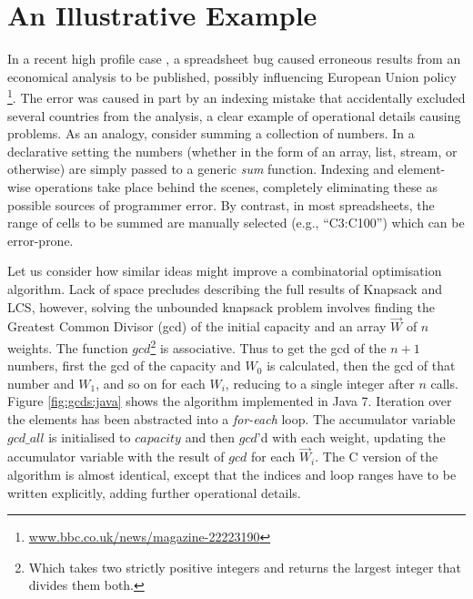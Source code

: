 \section{An Illustrative Example}
In a recent high profile case \cite{Herndon13}, a spreadsheet bug caused
erroneous results from an economical analysis to be published, possibly
influencing European Union policy%
\footnote{\url{www.bbc.co.uk/news/magazine-22223190}}.
The error was caused in part by an indexing mistake that accidentally excluded
several countries from the analysis, a clear example of operational details causing
problems.
As an analogy, consider summing a collection of numbers. In a declarative
setting
the numbers (whether in the form of an array, list, stream, or
otherwise) are simply passed to a generic \emph{sum} function. Indexing and
element-wise operations take place behind the scenes, completely eliminating
these as possible sources of programmer error. By contrast, in most spreadsheets, the range of cells to
be summed are manually selected (e.g., ``C3:C100'') which can be error-prone.


Let us consider how similar ideas might improve a combinatorial
optimisation algorithm. 
Lack of space precludes describing the full results of Knapsack and LCS, however, solving the unbounded knapsack problem involves finding the Greatest Common Divisor (gcd) of the initial capacity and an array $\vec{W}$ of $n$
weights. The function $gcd$\footnote{Which takes two strictly positive integers and returns the largest integer that divides them both.}
is associative. Thus to get the gcd of the $n+1$ numbers, first the gcd of the capacity and $W_0$ is calculated, then the gcd of that number and $W_1$, and so on for each $W_i$,
reducing to a single integer after $n$ calls. Figure \ref{fig:gcds:java} shows
the algorithm implemented in Java 7. Iteration over the elements has been
abstracted into a \emph{for-each} loop. The accumulator variable $gcd\_all$ is initialised to $capacity$ and then $gcd$'d with each weight, updating the accumulator
variable with the result of $gcd$ for each $\vec{W}_i$. The C version of
the algorithm is almost identical, except that the indices and loop ranges have to be written explicitly, adding further
operational details.

